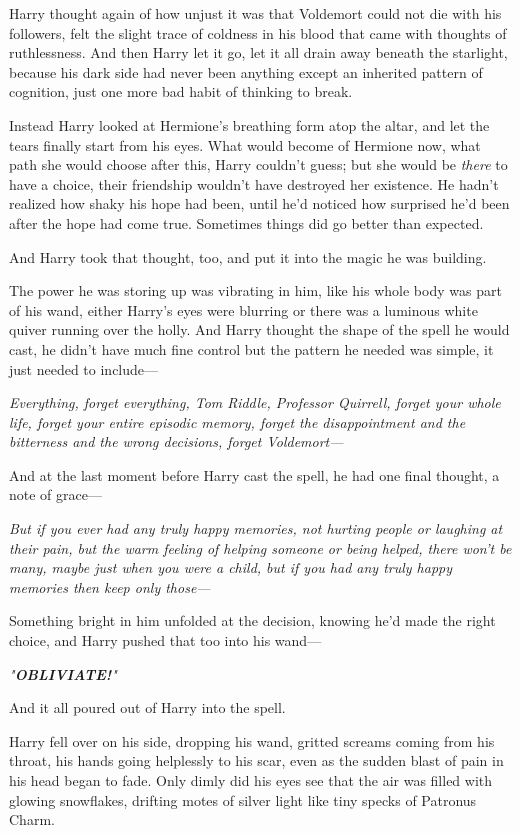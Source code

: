 Harry thought again of how unjust it was that Voldemort could not die with his
followers, felt the slight trace of coldness in his blood that came with
thoughts of ruthlessness. And then Harry let it go, let it all drain away
beneath the starlight, because his dark side had never been anything except an
inherited pattern of cognition, just one more bad habit of thinking to break.

Instead Harry looked at Hermione's breathing form atop the altar, and let the
tears finally start from his eyes. What would become of Hermione now, what path
she would choose after this, Harry couldn't guess; but she would be
\emph{there} to have a choice, their friendship wouldn't have destroyed her
existence. He hadn't realized how shaky his hope had been, until he'd noticed
how surprised he'd been after the hope had come true. Sometimes things did go
better than expected.

And Harry took that thought, too, and put it into the magic he was building.

The power he was storing up was vibrating in him, like his whole body was part
of his wand, either Harry's eyes were blurring or there was a luminous white
quiver running over the holly. And Harry thought the shape of the spell he
would cast, he didn't have much fine control but the pattern he needed was
simple, it just needed to include—

\emph{Everything, forget everything, Tom Riddle, Professor Quirrell, forget
your whole life, forget your entire episodic memory, forget the disappointment
and the bitterness and the wrong decisions, forget Voldemort—}

And at the last moment before Harry cast the spell, he had one final thought, a
note of grace—

\emph{But if you ever had any truly happy memories, not hurting people or
laughing at their pain, but the warm feeling of helping someone or being
helped, there won't be many, maybe just when you were a child, but if you had
any truly happy memories then keep only those—}

Something bright in him unfolded at the decision, knowing he'd made the right
choice, and Harry pushed that too into his wand—

\emph{"\textbf{OBLIVIATE!}"}

And it all poured out of Harry into the spell.

Harry fell over on his side, dropping his wand, gritted screams coming from his
throat, his hands going helplessly to his scar, even as the sudden blast of
pain in his head began to fade. Only dimly did his eyes see that the air was
filled with glowing snowflakes, drifting motes of silver light like tiny specks
of Patronus Charm.

